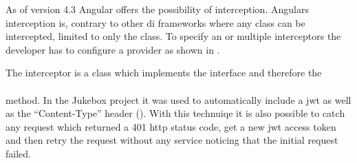 As of version 4.3 Angular offers the possibility of interception. Angulars interception is, contrary to other \gls{di} frameworks where any class can be intercepted, limited to only the  class. To specify an or multiple interceptors the developer has to configure a provider as shown in .


The interceptor is a class which implements the  interface and therefore the \\  \\ method. In the Jukebox project it was used to automatically include a \gls{jwt} as well as the \enquote{Content-Type} header (). With this technuiqe it is also possible to catch any request which returned a 401 \gls{http} status code, get a new \gls{jwt} access token and then retry the request without any service noticing that the initial request failed.
